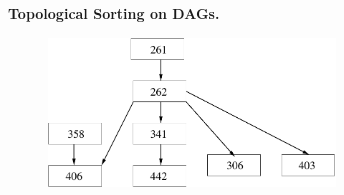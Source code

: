 \documentclass[12pt]{article}
\begin{document}
\newcommand{\I}{\mbox{{\em Int}}}
\newcommand{\lt}{\mbox{{\em left}}}
\newcommand{\rt}{\mbox{{\em right}}}
\newcommand{\ld}{\Delta^l}
\newcommand{\rd}{\Delta^r}
\newcommand{\lsp}[1]{\large\renewcommand{\baselinestretch}{#1}\normalsize}
\newcommand{\hsp}{\hspace{.2in}}

\def\Endwhile{\mbox{\bf endwhile\ }}
\def\Or{\mbox{\bf or\ }}
\def\Do{\mbox{\bf do\ }}
\def\Downto{\mbox{\bf downto\ }}
\def\Int{\mbox{\bf int\ }}
\def\To{\mbox{\bf to\ }}
\def\Repeat{\mbox{\bf repeat\ }}
\def\Until{\mbox{\bf until\ }}
\def\Return{\mbox{\bf return\ }}
\def\Not{\mbox{\bf not\ }}
\def\And{\mbox{\bf and\ }}
\def\For{\mbox{\bf for\ }}
\def\Foreach{\mbox{\bf foreach\ }}
\def\Else{\mbox{\bf else\ }}
\def\Elseif{\mbox{\bf elseif\ }}
\def\End{\mbox{\bf end\ }}
\def\If{\mbox{\bf if\ }}
\def\Mod{\mbox{\bf \ mod\ }}
\def\Then{\mbox{\bf then\ }}
\def\While{\mbox{\bf while\ }}
\def\Output{\mbox{\bf output\ }}


\lsp{1}
\pagestyle{plain}
\begin{center}
{\bf
Topological Sorting on DAGs.
}
\end{center}

\begin{figure}[h]
\center
\includegraphics[width = 3in]{flowchart.pdf}
\end{figure}
\end{document}
